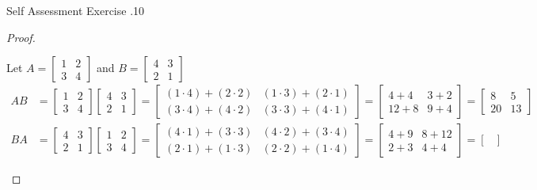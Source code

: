 \documentclass[../notes.tex]{subfiles}
\begin{document}
\begin{exercise}{Self Assessment Exercise \thechapter.10}
\begin{enumerate}
							\begin{proof}
								$ $
								\begin{subproof} Let 
									$A = \begin{bmatrix}1 & 2\\ 3 & 4
								\end{bmatrix}$ and $B = \begin{bmatrix}4 & 3 \\ 2 & 1\end{bmatrix}$
									\begin{align*}
										AB &= \begin{bmatrix}
											1 & 2 \\ 3 & 4
										\end{bmatrix}\begin{bmatrix}
											4 & 3 \\ 2 & 1
										\end{bmatrix} = \begin{bmatrix}
											(1 \cdot 4) + (2 \cdot 2) & (1 \cdot 3) + (2 \cdot 1)\\
											(3 \cdot 4) + (4 \cdot 2) & (3 \cdot 3) + (4 \cdot 1)
										\end{bmatrix} = \begin{bmatrix}
											4 + 4 & 3 + 2\\
											12 + 8 & 9 + 4
										\end{bmatrix} = \begin{bmatrix}
											8 & 5\\
											20 & 13
										\end{bmatrix}\\
										BA &= \begin{bmatrix}
											4 & 3 \\ 2 & 1
										\end{bmatrix} \begin{bmatrix}
											1 & 2 \\ 3 & 4
										\end{bmatrix} = \begin{bmatrix}
											(4 \cdot 1) + (3 \cdot 3) & (4 \cdot 2) + (3 \cdot 4)\\
											(2 \cdot 1) + (1 \cdot 3) & (2 \cdot 2) + (1 \cdot 4)
										\end{bmatrix} = \begin{bmatrix}
											4 + 9 & 8 + 12\\
											2 + 3 & 4 + 4
										\end{bmatrix} = \begin{bmatrix}

\end{bmatrix}
\end{align*}
\end{subproof}
\end{proof}
\end{enumerate}
\end{exercise}
\end{document}
